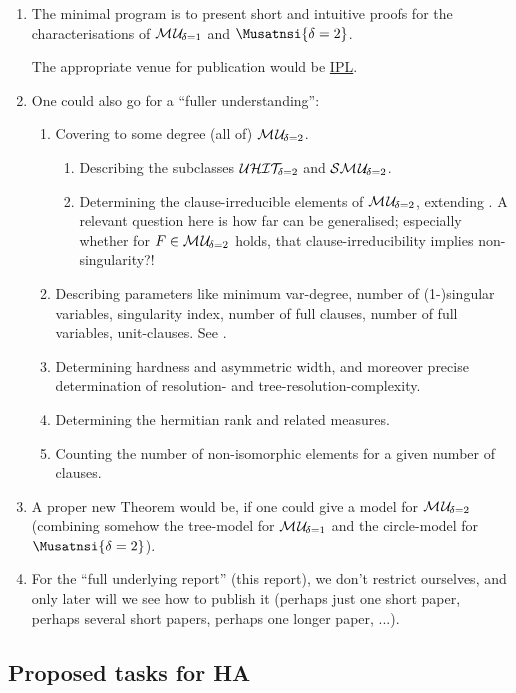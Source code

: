 \documentclass{article}
\newcommand{\Schrift}{report}
\begin{document}
\begin{enumerate}
\item The minimal program is to present short and intuitive proofs for the characterisations of $\mathcal{M\hspace{0.8pt}U}_{\!\delta=1}$ and $\Musatnsi{\delta=2}$.

  The appropriate venue for publication would be \href{http://www.sciencedirect.com/science/journal/00200190}{IPL}.
\item One could also go for a ``fuller understanding'':
  \begin{enumerate}
  \item Covering to some degree (all of) $\mathcal{M\hspace{0.8pt}U}_{\!\delta=2}$.
    \begin{enumerate}
    \item Describing the subclasses $\mathcal{U}\mathcal{HIT}_{\!\!\delta=2}$ and $\mathcal{S}\mathcal{M\hspace{0.8pt}U}_{\!\delta=2}$.
    \item Determining the clause-irreducible elements of $\mathcal{M\hspace{0.8pt}U}_{\!\delta=2}$, extending \cite[Lemma 41]{KullmannZhao2016UHitSAT}. A relevant question here is how far \cite[Lemma 36]{KullmannZhao2016UHitSAT} can be generalised; especially whether for $F \in \mathcal{M\hspace{0.8pt}U}_{\!\delta=2}$ holds, that clause-irreducibility implies non-singularity?!
    \end{enumerate}
  \item Describing parameters like minimum var-degree, number of (1-)singular variables, singularity index, number of full clauses, number of full variables, unit-clauses. See \cite[Section 5]{KullmannZhao2016UHit}.
  \item Determining hardness and asymmetric width, and moreover precise determination of resolution- and tree-resolution-complexity.
  \item Determining the hermitian rank and related measures.
  \item Counting the number of non-isomorphic elements for a given number of clauses.
  \end{enumerate}
\item A proper new Theorem would be, if one could give a model for $\mathcal{M\hspace{0.8pt}U}_{\!\delta=2}$ (combining somehow the tree-model for $\mathcal{M\hspace{0.8pt}U}_{\!\delta=1}$ and the circle-model for $\Musatnsi{\delta=2}$).
\item For the ``full underlying report'' (this \Schrift), we don't restrict ourselves, and only later will we see how to publish it (perhaps just one short paper, perhaps several short papers, perhaps one longer paper, ...).
\end{enumerate}


\subsection{Proposed tasks for HA}
\end{document}
